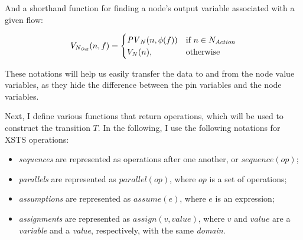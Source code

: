 And a shorthand function for finding a node's output variable associated with a given flow:

\begin{equation*}
	V_{N_\mathit{Out}}(n, f) = 
	\begin{cases}
		\mathit{PV}_N(n, \phi(f)) & \text{if } n \in N_{Action} \\
		V_N(n), & \text{otherwise}
	\end{cases}
\end{equation*}

These notations will help us easily transfer the data to and from the node value variables, as they hide the difference between the pin variables and the node variables.

\newcommand{\enabled}{\mathit{En}}

Next, I define various functions that return operations, which will be used to construct the transition \(T\). In the following, I use the following notations for XSTS operations:

\begin{itemize}
	\item \emph{sequences} are represented as operations after one another, or \(\mathit{sequence}(op)\);
	\item \emph{parallels} are represented as \(\mathit{parallel}(op)\), where \(op\) is a set of operations;
	\item \emph{assumptions} are represented as \(\mathit{assume}(e)\), where \(e\) is an expression;
	\item \emph{assignments} are represented as \(\mathit{assign}(v, value)\), where \(v\) and \(value\) are a \emph{variable} and a \emph{value}, respectively, with the same \emph{domain}.
\end{itemize}

